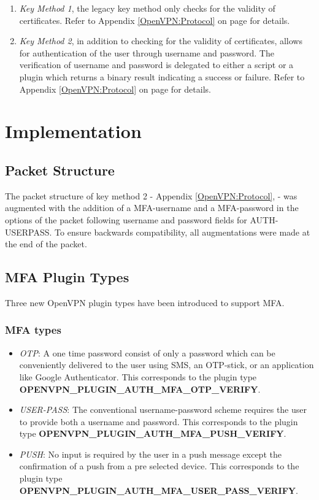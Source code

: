 \documentclass[11pt,oneside]{book}
\begin{document}
\begin{enumerate}
    \item \emph{Key Method 1}, the legacy key method only checks for the validity of certificates.
        Refer to Appendix \ref{OpenVPN:Protocol} on page \pageref{OpenVPN:Protocol} for details.
    \item \emph{Key Method 2}, in addition to checking for the validity of certificates, allows for
        authentication of the user through username and password. The verification of username and
        password is delegated to either a script or a plugin which returns a binary result
        indicating a success or failure.
        Refer to Appendix \ref{OpenVPN:Protocol} on page \pageref{OpenVPN:Protocol} for details.
\end{enumerate}

\section{Implementation}
\label{MFA:Implementation}
\subsection{Packet Structure}
The packet structure of key method 2 - Appendix \ref{OpenVPN:Protocol}, \pageref{OpenVPN:protocol} -
was augmented with the addition of a MFA-username and a MFA-password in the options of the packet
following username and password fields for AUTH-USERPASS. To ensure backwards compatibility, all
augmentations were made at the end of the packet.

\subsection{MFA Plugin Types}
\label{MFA:Types}
Three new OpenVPN plugin types have been introduced to support MFA.

\subsubsection{MFA types}
\begin{itemize}
    \item \emph{OTP}: A one time password consist of only a password which can be conveniently
        delivered to the user using SMS, an OTP-stick, or an application like Google Authenticator.
        This corresponds to the plugin type\\
        \textbf{OPENVPN\_PLUGIN\_AUTH\_MFA\_OTP\_VERIFY}.
    \item \emph{USER-PASS}: The conventional username-password scheme requires the user to provide
        both a username and password.
        This corresponds to the plugin type \textbf{OPENVPN\_PLUGIN\_AUTH\_MFA\_PUSH\_VERIFY}.
    \item \emph{PUSH}: No input is required by the user in a push message except the confirmation
        of a push from a pre selected device.
        This corresponds to the plugin type \textbf{OPENVPN\_PLUGIN\_AUTH\_MFA\_USER\_PASS\_VERIFY}.
\end{itemize}
\end{document}
